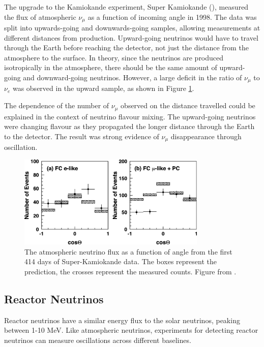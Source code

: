 The upgrade to the Kamiokande experiment, Super Kamiokande (\SK), measured the flux of atmospheric $\nu_{\mu}$ as a function of incoming angle in 1998. The data was split into upwards-going and downwards-going samples, allowing measurements at different distances from production. Upward-going neutrinos would have to travel through the Earth before reaching the detector, not just the distance from the atmosphere to the surface. In theory, since the neutrinos are produced isotropically in the atmosphere, there should be the same amount of upward-going and downward-going neutrinos. However, a large deficit in the ratio of $\nu_{\mu}$ to $\nu_e$ was observed in the upward sample, as shown in Figure \ref{atmosflux}.

The dependence of the number of $\nu_{\mu}$ observed on the distance travelled could be explained in the context of neutrino flavour mixing. The upward-going neutrinos were changing flavour as they propagated the longer distance through the Earth to the detector. The \SK result was strong evidence of $\nu_{\mu}$ disappearance through oscillation.

\begin{figure}[!htbp]
\vspace{20pt}
\centering
\includegraphics*[width=0.8\textwidth,clip]{figs/atmosfluxsk.png}
\caption{The atmospheric neutrino flux as a function of angle from the first 414 days of Super-Kamiokande data. The boxes represent the prediction, the crosses represent the measured counts. Figure from \cite{skfluxatmos}.} \label{atmosflux}
\end{figure}

\subsection{Reactor Neutrinos}\label{sec:reactorneutrinos}

Reactor neutrinos have a similar energy flux to the solar neutrinos, peaking between 1-10 MeV. Like atmospheric neutrinos, experiments for detecting reactor neutrinos can measure oscillations across different baselines.

